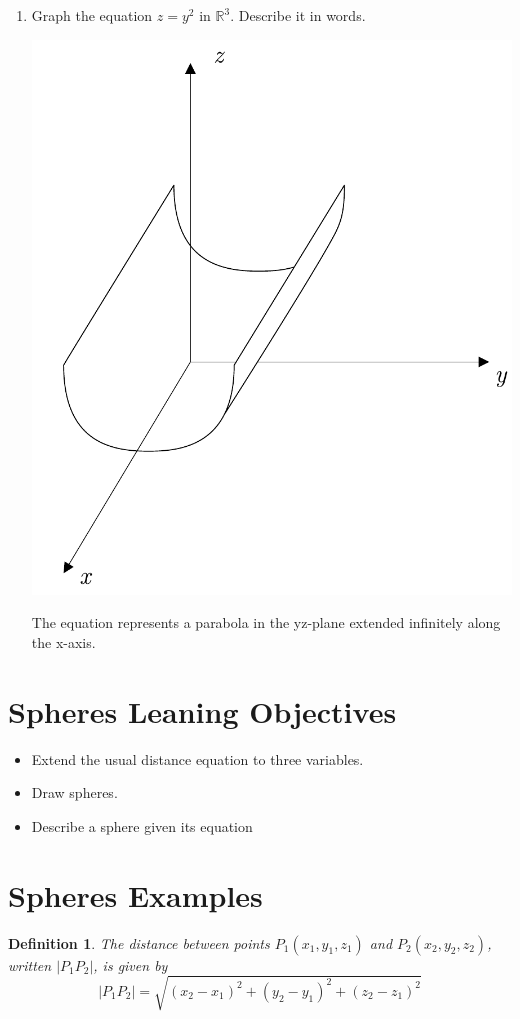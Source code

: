 \documentclass[12pt]{exam}
\newtheorem*{definition}{Definition}
\begin{document}
\begin{enumerate}
{\begin{enumerate}
        \item
        {
          Graph the equation $z=y^{2}$ in $\mathbb{R}^{3}$.
          Describe it in words.
          \begin{solution}
            \begin{center}
              \includegraphics[width=.6\textwidth]{12-1-z-y3.pdf}
            \end{center}
            The equation represents a parabola in the yz-plane extended infinitely along the x-axis.
          \end{solution}
        }
  \end{enumerate}}
\end{enumerate}
  
\section*{Spheres Leaning Objectives}
  \begin{itemize}
    \item{
      Extend the usual distance equation to three variables.
    }
    \item{
      Draw spheres.
    }
    \item{
      Describe a sphere given its equation
    }
  \end{itemize}
  
\section*{Spheres Examples}
  \begin{definition}
    The distance between points $P_{1}(x_{1},y_{1},z_{1})$ and $P_{2}(x_{2},y_{2},z_{2})$, written $|P_{1}P_{2}|$, is given by
    \[
      |P_{1}P_{2}|=\sqrt{(x_{2}-x_{1})^{2}+(y_{2}-y_{1})^{2}+(z_{2}-z_{1})^{2}}
    \]
  \end{definition}
  
\end{document}
